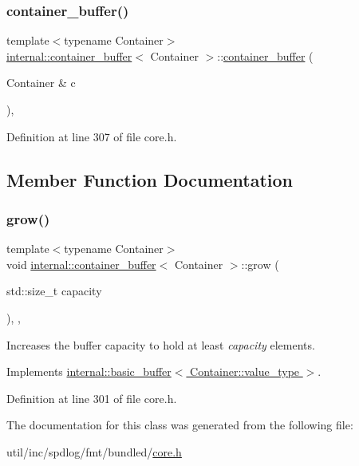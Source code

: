 \subsubsection{\texorpdfstring{container\+\_\+buffer()}{container\_buffer()}}
{\footnotesize\ttfamily template$<$typename Container$>$ \\
\hyperlink{classinternal_1_1container__buffer}{internal\+::container\+\_\+buffer}$<$ Container $>$\+::\hyperlink{classinternal_1_1container__buffer}{container\+\_\+buffer} (\begin{DoxyParamCaption}\item[{Container \&}]{c }\end{DoxyParamCaption})\hspace{0.3cm}{\ttfamily [inline]}, {\ttfamily [explicit]}}



Definition at line 307 of file core.\+h.



\subsection{Member Function Documentation}
\mbox{\label{classinternal_1_1container__buffer_a9dc9c633e12053ddf07af13b30b378b3}} 
\subsubsection{\texorpdfstring{grow()}{grow()}}
{\footnotesize\ttfamily template$<$typename Container$>$ \\
void \hyperlink{classinternal_1_1container__buffer}{internal\+::container\+\_\+buffer}$<$ Container $>$\+::grow (\begin{DoxyParamCaption}\item[{std\+::size\+\_\+t}]{capacity }\end{DoxyParamCaption})\hspace{0.3cm}{\ttfamily [inline]}, {\ttfamily [protected]}, {\ttfamily [virtual]}}

Increases the buffer capacity to hold at least {\itshape capacity} elements. 

Implements \hyperlink{classinternal_1_1basic__buffer_a01fbeed379e2af2c79baf5c9b5dc92e8}{internal\+::basic\+\_\+buffer$<$ Container\+::value\+\_\+type $>$}.



Definition at line 301 of file core.\+h.



The documentation for this class was generated from the following file\+:\begin{DoxyCompactItemize}
\item 
util/inc/spdlog/fmt/bundled/\hyperlink{core_8h}{core.\+h}\end{DoxyCompactItemize}
